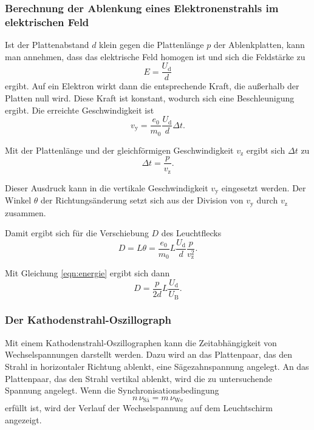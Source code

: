 \subsubsection{Berechnung der Ablenkung eines Elektronenstrahls im elektrischen Feld} %
Ist der Plattenabstand $d$ klein gegen die Plattenlänge $p$ 
der Ablenkplatten, kann man annehmen, dass das elektrische 
Feld homogen ist und sich die Feldstärke zu
\begin{equation*}
    E = \frac{U_\text{d}}{d}
\end{equation*} 
ergibt. Auf ein Elektron wirkt dann die entsprechende Kraft, 
die außerhalb der Platten null wird. Diese Kraft ist konstant, 
wodurch sich eine Beschleunigung 
ergibt. 
Die erreichte Geschwindigkeit ist 
\begin{equation*}
    v_\text{y} = \frac{e_\text{0}}{m_\text{0}} \frac{U_\text{d}}{d} \Delta t.
\end{equation*}

\noindent Mit der Plattenlänge und der 
gleichförmigen Geschwindigkeit $v_\text{z}$ ergibt sich $\Delta t$ zu
\begin{equation*}
    \Delta t = \frac{p}{v_\text{z}}.
\end{equation*}

\noindent Dieser Ausdruck kann in die vertikale 
Geschwindigkeit $v_\text{y}$ eingesetzt werden. Der Winkel $\theta$ der 
Richtungsänderung setzt sich aus der Division von 
$v_\text{y}$ durch $v_\text{z}$ zusammen. 

\noindent Damit ergibt sich für die Verschiebung $D$ des Leuchtflecks 
\begin{equation*}
    D = L \theta = \frac{e_\text{0}}{m_\text{0}} L \frac{U_\text{d}}{d} \frac{p}{v_\text{z}^2}.
\end{equation*}

\noindent Mit Gleichung \eqref{eqn:energie} ergibt sich dann 
\begin{equation}
    D = \frac{p}{2d} L \frac{U_\text{d}}{U_\text{B}}.
    \label{eqn:leuchtfleck}
\end{equation}

\subsubsection{Der Kathodenstrahl-Oszillograph}
Mit einem Kathodenstrahl-Oszillographen kann die Zeitabhängigkeit
von Wechselspannungen darstellt werden.
Dazu wird an das Plattenpaar, das den Strahl in horizontaler
Richtung ablenkt, eine Sägezahnspannung angelegt. An das Plattenpaar,
das den Strahl vertikal ablenkt, wird die zu untersuchende
Spannung angelegt. Wenn die Synchronisationsbedingung
\begin{equation*}
    n \, \nu_\text{Sä} = m \, \nu_\text{We}
\end{equation*}
erfüllt ist, wird der Verlauf der Wechselspannung auf dem
Leuchtschirm angezeigt.


